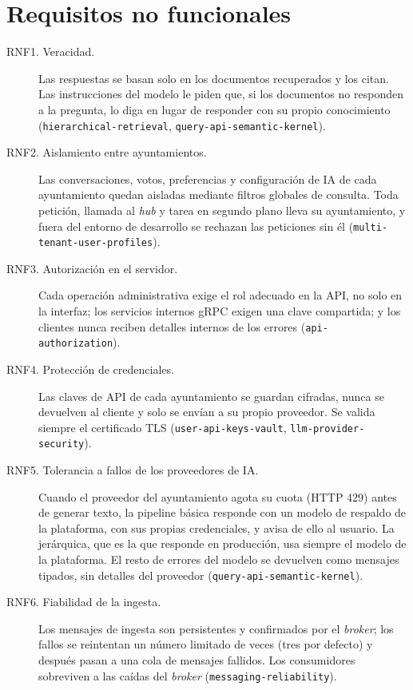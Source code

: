 \FloatBarrier
\section{Requisitos no funcionales}
\label{sec:rnf-detalle}

{\sloppy
\begin{description}
  \item[RNF1. Veracidad.] Las respuestas se basan solo en los documentos recuperados y los citan. Las instrucciones del modelo le piden que, si los documentos no responden a la pregunta, lo diga en lugar de responder con su propio conocimiento (\texttt{hierarchical-retrieval}, \texttt{query-api-semantic-kernel}).  \item[RNF2. Aislamiento entre ayuntamientos.] Las conversaciones, votos, preferencias y configuración de IA de cada ayuntamiento quedan aisladas mediante filtros globales de consulta. Toda petición, llamada al \emph{hub} y tarea en segundo plano lleva su ayuntamiento, y fuera del entorno de desarrollo se rechazan las peticiones sin él (\texttt{multi-tenant-user-profiles}).
  \item[RNF3. Autorización en el servidor.] Cada operación administrativa exige el rol adecuado en la API, no solo en la interfaz; los servicios internos gRPC exigen una clave compartida; y los clientes nunca reciben detalles internos de los errores (\texttt{api-authorization}).
  \item[RNF4. Protección de credenciales.] Las claves de API de cada ayuntamiento se guardan cifradas, nunca se devuelven al cliente y solo se envían a su propio proveedor. Se valida siempre el certificado TLS (\texttt{user-api-keys-vault}, \texttt{llm-provider-security}).
  \item[RNF5. Tolerancia a fallos de los proveedores de IA.] Cuando el proveedor del ayuntamiento agota su cuota (HTTP 429) antes de generar texto, la pipeline básica responde con un modelo de respaldo de la plataforma, con sus propias credenciales, y avisa de ello al usuario. La jerárquica, que es la que responde en producción, usa siempre el modelo de la plataforma. El resto de errores del modelo se devuelven como mensajes tipados, sin detalles del proveedor (\texttt{query-api-semantic-kernel}).
  \item[RNF6. Fiabilidad de la ingesta.] Los mensajes de ingesta son persistentes y confirmados por el \emph{broker}; los fallos se reintentan un número limitado de veces (tres por defecto) y después pasan a una cola de mensajes fallidos. Los consumidores sobreviven a las caídas del \emph{broker} (\texttt{messaging-reliability}).

\end{description}}
